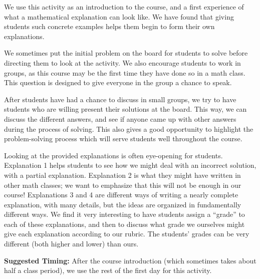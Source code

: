 \documentclass[nooutcomes]{ximera}
\begin{document}
\begin{instructorNotes}
We use this activity as an introduction to the course, and a first experience of what a mathematical explanation can look like.  We have found that giving students such concrete examples helps them begin to form their own explanations.


We sometimes put the initial problem on the board for students to solve before directing them to look at the activity.  We also encourage students to work in groups, as this course may be the first time they have done so in a math class.  This question is designed to give everyone in the group a chance to speak.

After students have had a chance to discuss in small groups, we try to have students who are willing present their solutions at the board.  This way, we can discuss the different answers, and see if anyone came up with other answers during the process of solving.  This also gives a good opportunity to highlight the problem-solving process which will serve students well throughout the course.



Looking at the provided explanations is often eye-opening for students.  Explanation 1 helps students to see how we might deal with an incorrect solution, with a partial explanation.  Explanation 2 is what they might have written in other math classes; we want to emphasize that this will not be enough in our course!  Explanations 3 and 4 are different ways of writing a nearly complete explanation, with many details, but the ideas are organized in fundamentally different ways.  We find it very interesting to have students assign a ``grade'' to each of these explanations, and then to discuss what grade we ourselves might give each explanation according to our rubric.  The students' grades can be very different (both higher and lower) than ours.


{\bf Suggested Timing:} After the course introduction (which sometimes takes about half a class period), we use the rest of the first day for this activity.

\end{instructorNotes}
\end{document}

